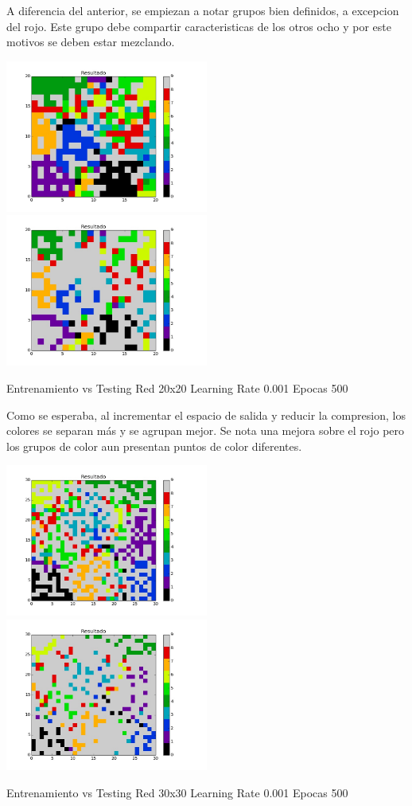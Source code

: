 A diferencia del anterior, se empiezan a notar grupos bien definidos, a excepcion del rojo. Este grupo debe compartir caracteristicas de los otros ocho y por este motivos se deben estar mezclando. 

\includegraphics[width=0.5\textwidth]{img/ej2_train_M_20_lrate_001_epocas_500}
\includegraphics[width=0.5\textwidth]{img/ej2_test_M_20_lrate_001_epocas_500}
{\center \footnotesize Entrenamiento vs Testing Red 20x20 Learning Rate 0.001 Epocas 500\par}

Como se esperaba, al incrementar el espacio de salida y reducir la compresion, los colores se separan m\'as y se agrupan mejor. Se nota una mejora sobre el rojo pero los grupos de color aun presentan puntos de color diferentes.

\includegraphics[width=0.5\textwidth]{img/ej2_train_M_30_lrate_001_epocas_500}
\includegraphics[width=0.5\textwidth]{img/ej2_test_M_30_lrate_001_epocas_500}
{\footnotesize Entrenamiento vs Testing Red 30x30 Learning Rate 0.001 Epocas 500\par}

